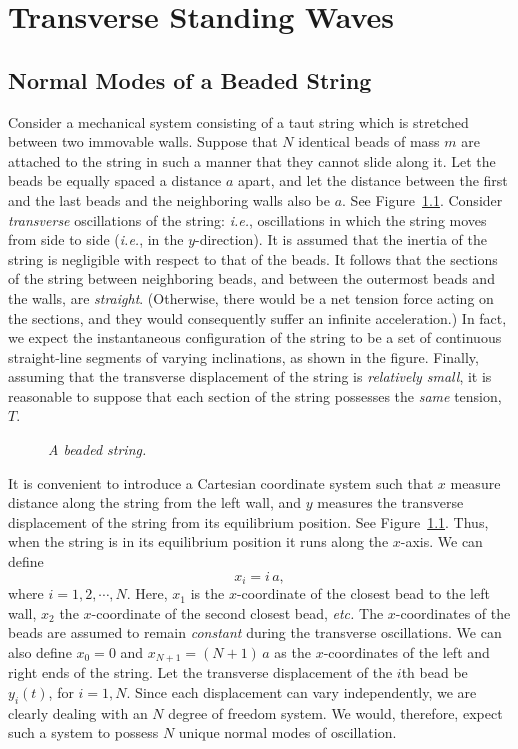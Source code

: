 \chapter{Transverse Standing Waves}\label{c5}
\section{Normal Modes of a Beaded String}\label{s5.1}
Consider a mechanical system consisting of a taut string which is stretched
between two immovable walls. Suppose that $N$ identical beads of
mass $m$ are attached to the string in such a manner that they cannot slide along it. Let the beads be equally
spaced a  distance $a$ apart, and let the distance between the first and the last beads and
the neighboring walls also be $a$. See Figure~\ref{f5.1}. Consider {\em transverse}\/ 
oscillations of the string: {\em i.e.}, oscillations in which the string
moves from side to side ({\em i.e.}, in the $y$-direction). 
It is assumed that the inertia of the string
is negligible with respect to that of the beads. It follows that the sections of the string
between neighboring beads, and between the outermost beads and the walls,
are {\em straight}. (Otherwise, there would be a net tension force acting on the sections, and
they would consequently suffer an infinite acceleration.) In fact, we expect the instantaneous configuration of the string to be a
set of continuous straight-line segments of varying inclinations, as shown in the figure. Finally, assuming that
the transverse displacement of the string is {\em relatively small}, it is
reasonable to suppose that each section of the string possesses the
{\em same}\/ tension, $T$. 

\begin{figure}
\epsfysize=1.6in
\centerline{}
\caption{\em A beaded string.}\label{f5.1}   
\end{figure}

It is convenient to introduce a Cartesian coordinate system such  that $x$
measure distance along the string from the left wall, and
$y$ measures the transverse displacement of the string from its
equilibrium position. See Figure~\ref{f5.1}. Thus, when the string is in its equilibrium position
it runs along the $x$-axis. We can define
\begin{equation}
x_i = i\,a,\label{e5.1}
\end{equation}
where $i=1,2,\cdots, N$. Here, $x_1$ is the $x$-coordinate of the
closest bead to the left wall, $x_2$ the
$x$-coordinate of the second closest bead, {\em etc.} The $x$-coordinates of the beads
are assumed to remain {\em constant}\/ during the transverse oscillations. 
We can also define $x_0=0$
and $x_{N+1}= (N+1)\,a$ as the $x$-coordinates of the left
and right ends of the string. Let the transverse displacement
of the $i$th bead be $y_i(t)$, for $i=1,N$. Since each displacement
can vary independently, we are clearly dealing with an $N$ degree of freedom system. 
We would, therefore, expect such a system to possess $N$ unique normal modes of
oscillation. 

